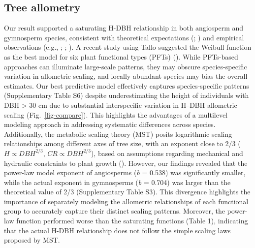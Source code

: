 \documentclass[
  12pt,
  letterpaper,
  DIV=11,
  numbers=noendperiod]{scrartcl}
\begin{document}
\subsection{Tree allometry}\label{tree-allometry}

Our result supported a saturating H-DBH relationship in both angiosperm
and gymnosperm species, consistent with theoretical expectations
(;
) and empirical observations
(e.g., ;
;
). A recent study using Tallo
suggested the Weibull function as the best model for six plant
functional types (PFTs) ().
While PFTs-based approaches can illuminate large-scale patterns, they
may obscure species-specific variation in allometric scaling, and
locally abundant species may bias the overall estimates. Our best
predictive model effectively captures species-specific patterns
(Supplementary Table S6) despite underestimating the height of
individuals with DBH \textgreater{} 30 cm due to substantial
interspecific variation in H--DBH allometric scaling
(Fig.~\ref{fig-compare}). This highlights the advantages of a multilevel
modeling approach in addressing systematic differences across species.
Additionally, the metabolic scaling theory (MST) posits logarithmic
scaling relationships among different axes of tree size, with an
exponent close to 2/3 (\(H \propto DBH^{2/3}\),
\(CR \propto DBH^{2/3}\)), based on assumptions regarding mechanical and
hydraulic constraints to plant growth (). However, our findings revealed that the power-law model
exponent of angiosperms (\emph{b} = 0.538) was significantly smaller,
while the actual exponent in gymnosperms (\emph{b} = 0.704) was larger
than the theoretical value of 2/3 (Supplementary Table S3). This
divergence highlights the importance of separately modeling the
allometric relationships of each functional group to accurately capture
their distinct scaling patterns. Moreover, the power-law function
performed worse than the saturating functions (Table 1), indicating that
the actual H-DBH relationship does not follow the simple scaling laws
proposed by MST.
\end{document}
